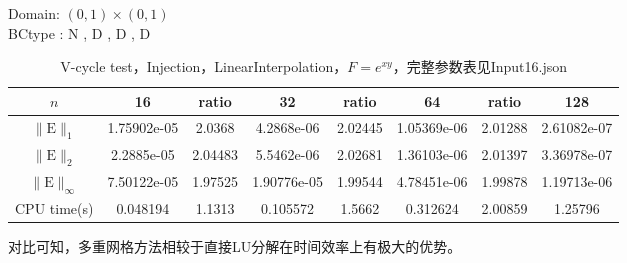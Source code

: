 \documentclass[a4paper,twoside]{ctexart}
\begin{document}
\noindent Domain: $(0,1)\times(0,1)$\\
BCtype : N , D , D , D
\begin{table}[htbp]
\centering\begin{tabular}{c|ccccccc}
\hline
$n$&16&ratio&32&ratio&64&ratio&128\\
\hline
$\|\mathrm{E}\|_1$&1.75902e-05&2.0368&4.2868e-06&2.02445&1.05369e-06&2.01288&2.61082e-07\\
\hline
$\|\mathrm{E}\|_2$&2.2885e-05&2.04483&5.5462e-06&2.02681&1.36103e-06&2.01397&3.36978e-07\\
\hline
$\|\mathrm{E}\|_{\infty}$&7.50122e-05&1.97525&1.90776e-05&1.99544&4.78451e-06&1.99878&1.19713e-06\\
\hline
CPU time(s)&0.048194&1.1313&0.105572&1.5662&0.312624&2.00859&1.25796\\
\hline
\end{tabular}
\caption{V-cycle test，Injection，LinearInterpolation，$F=e^{xy}$，完整参数表见Input16.json}
\end{table}

对比可知，多重网格方法相较于直接LU分解在时间效率上有极大的优势。
\end{document}
